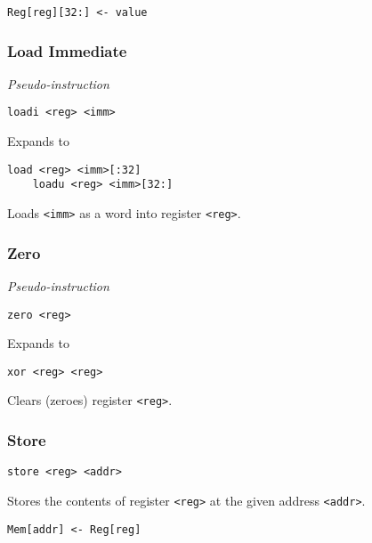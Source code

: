 \begin{lstlisting}[style=rtn]
    Reg[reg][32:] <- value
\end{lstlisting}

\subsubsection{Load Immediate}

\textit{Pseudo-instruction}

\begin{lstlisting}[style=assembly]
    loadi <reg> <imm>
\end{lstlisting}

Expands to

\begin{lstlisting}[style=assembly]
    load <reg> <imm>[:32]
    loadu <reg> <imm>[32:]
\end{lstlisting}

Loads \texttt{<imm>} as a word into register \texttt{<reg>}.

\subsubsection{Zero}

\textit{Pseudo-instruction}

\begin{lstlisting}[style=assembly]
    zero <reg>
\end{lstlisting}

Expands to

\begin{lstlisting}[style=assembly]
    xor <reg> <reg>
\end{lstlisting}

Clears (zeroes) register \texttt{<reg>}.

\subsubsection{Store}

\begin{lstlisting}[style=assembly]
    store <reg> <addr>
\end{lstlisting}

Stores the contents of register \texttt{<reg>} at the given address \texttt{<addr>}.

\begin{lstlisting}[style=rtn]
    Mem[addr] <- Reg[reg]
\end{lstlisting}

